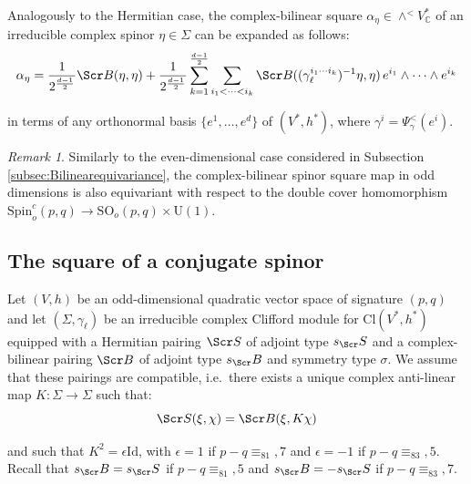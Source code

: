 \documentclass[10pt,a4paper,twoside,reqno]{amsart}
\theoremstyle{plain}
\theoremstyle{definition}
\theoremstyle{remark}
\newtheorem{remark}[thm]{Remark}
\def\C{\mathbb{C}}
\def\Id{\mathrm{Id}}
\def\scB{\Scr B}
\def\scS{\Scr S}
\def\Cl{\mathrm{Cl}}
\def\Spin{\mathrm{Spin}}
\def\Spin{\mathrm{Spin}}
\def\SO{\mathrm{SO}}
\def\U{\mathrm{U}}
\begin{document}
\noindent
Analogously to the Hermitian case, the complex-bilinear square $\alpha_\eta\in\wedge^<V^*_\C$ of an irreducible complex spinor $\eta\in\Sigma$ can be expanded as follows:  
\begin{equation}
\label{eq:odd_explicit_complexbilinearsquare}
\alpha_{\eta} = \frac{1}{2^{\frac{d-1}{2}}} \scB(\eta,\eta) + \frac{1}{2^{\frac{d-1}{2}}} \sum_{k=1}^{\frac{d-1}{2}} \sum_{i_1 < \cdots < i_k} \scB((\gamma_\ell^{i_1 \cdots i_k})^{-1}\eta , \eta)\, e^{i_1}\wedge  \cdots \wedge e^{i_k}
\end{equation}

\noindent
in terms of any orthonormal basis $\{e^1,\hdots , e^d\}$ of $(V^*,h^*)$, where $\gamma^i = \Psi_{\gamma}^{<}(e^i)$.

\begin{remark}
Similarly to the even-dimensional case considered in Subsection \ref{subsec:Bilinearequivariance}, the complex-bilinear spinor square map in odd dimensions is also equivariant with respect to the double cover homomorphism $\Spin^c_o (p,q) \to \SO_o (p,q) \times \U(1) $.
\end{remark}


\subsection{The square of a conjugate spinor}


Let $(V,h)$ be an odd-dimensional quadratic vector space of signature $(p,q)$ and let $(\Sigma,\gamma_\ell)$ be an irreducible complex Clifford module for $\Cl(V^*,h^*)$ equipped with a Hermitian pairing $\scS$ of adjoint type $s_\scS$ and a complex-bilinear pairing $\scB$ of adjoint type $s_\scB$ and symmetry type $\sigma$. We assume that these pairings are compatible, i.e.\ there exists a unique complex anti-linear map $K\colon \Sigma \to \Sigma$ such that:
\begin{equation*}
\scS( \xi , \chi) = \scB( \xi , K \chi)
\end{equation*}

\noindent
and such that $K^2 = \epsilon \Id$, with $\epsilon=1$ if $p-q\equiv_81,7$ and $\epsilon = -1$ if $p-q\equiv_83,5$. Recall that $s_\scB=s_\scS$ if $p-q\equiv_81,5$ and  $s_\scB=-s_\scS$ if $p-q\equiv_83,7$.\medskip
\end{document}
